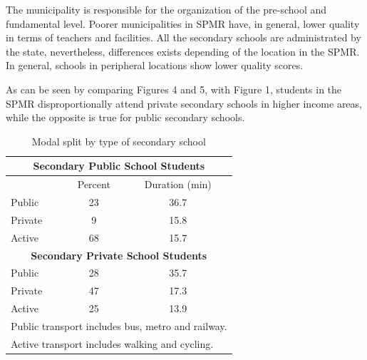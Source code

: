 \documentclass[]{article}
\begin{document}
The municipality is responsible for the organization of the pre-school
and fundamental level. Poorer municipalities in SPMR have, in general,
lower quality in terms of teachers and facilities. All the secondary
schools are administrated by the state, nevertheless, differences exists
depending of the location in the SPMR. In general, schools in peripheral
locations show lower quality scores.

As can be seen by comparing Figures 4 and 5, with Figure 1, students in
the SPMR disproportionally attend private secondary schools in higher
income areas, while the opposite is true for public secondary schools.
\begin{table}[]\centering \caption{Modal split by type of secondary school}
\begin{tabular}{lcc} \hline
\multicolumn{3}{c}{\textbf{Secondary Public School Students}}  \\  \hline
 & Percent & Duration (min)  \\ \hline
Public & 23 & 36.7 \\
Private & 9 & 15.8 \\
Active & 68 & 15.7 \\ \hline
\multicolumn{3}{c}{\textbf{Secondary Private School Students}}  \\  \hline
Public & 28 & 35.7 \\ 
Private & 47 & 17.3 \\
Active & 25 & 13.9 \\\hline
\multicolumn{3}{l}{\small Public transport includes bus, metro and railway.} \\
\multicolumn{3}{l}{\small Active transport includes walking and cycling.}  
\end{tabular}
\end{table}
\end{document}
